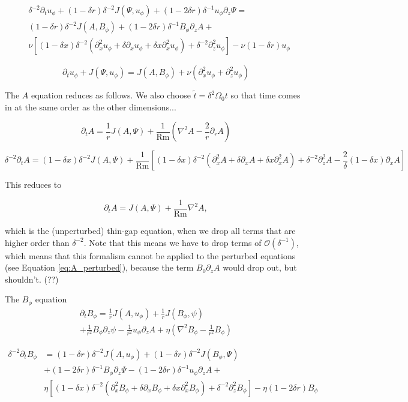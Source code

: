 \documentclass{paper}
\newcommand{\beq}{\begin{equation}}
\newcommand{\eeq}{\end{equation}}
\newcommand{\uphi}{\ensuremath{u_\phi}}
\newcommand\reym{\mathrm{Rm}}
\begin{document}
\beq
\begin{split}
& \delta^{-2} \partial_t u_\phi + (1 - \delta r)\delta^{-2} J(\Psi, u_\phi) + (1 - 2\delta r)\delta^{-1} u_\phi \partial_z \Psi  = \\
& (1 - \delta r)\delta^{-2} J(A, B_\phi) + (1 - 2\delta r)\delta^{-1} B_\phi \partial_z A + \\
& \nu \left[(1 - \delta x) \delta^{-2} \left(\partial_x^2 u_\phi + \delta \partial_x u_\phi + \delta x \partial_x^2 u_\phi \right) + \delta^{-2} \partial_z^2 u_\phi \right] - \nu(1 - \delta r) u_\phi
\end{split}
\eeq

\beq
\partial_t u_\phi + J(\Psi, u_\phi) = J(A, B_\phi) + \nu(\partial_x^2 u_\phi + \partial_z^2 u_\phi)
\eeq


The $A$ equation reduces as follows. We also choose $\widetilde{t} = \delta^2 \Omega_0 t$ so that time comes in at the same order as the other dimensions...

\beq
\partial_t A = \frac{1}{r} J (A, \Psi) + \frac{1}{\reym} \left(\nabla^2 A - \frac{2}{r}\partial_r A \right)
\eeq

\beq
\delta^{-2} \partial_t A = (1 - \delta x)\delta^{-2} J(A, \Psi) + \frac{1}{\reym} \left[(1 - \delta x) \delta^{-2} \left(\partial_x^2 A + \delta\partial_x A + \delta x \partial_x^2 A \right) + \delta^{-2} \partial_z^2 A - \frac{2}{\delta}(1 - \delta x) \partial_x A \right]
\eeq

This reduces to 

\beq
\partial_t A = J(A, \Psi) + \frac{1}{\reym} \nabla^2 A,
\eeq

which is the (unperturbed) thin-gap equation, when we drop all terms that are higher order than $\delta^{-2}$. Note that this means we have to drop terms of $\mathcal{O}(\delta^{-1})$, which means that this formalism cannot be applied to the perturbed equations (see Equation \ref{eq:A_perturbed}), because the term $B_0\partial_zA$ would drop out, but shouldn't. (??)

The $B_\phi$ equation
\begin{multline}
\partial_t B_\phi = \frac{1}{r} J(A, \uphi) + \frac{1}{r} J(B_\phi, \psi)\\
+ \frac{1}{r^2} B_\phi \partial_z \psi - \frac{1}{r^2} \uphi \partial_z A + \eta \left(\nabla^2 B_\phi - \frac{1}{r^2} B_\phi \right)
\end{multline}

\beq
\begin{split}
\delta^{-2} \partial_t B_\phi  & = (1 - \delta r) \delta^{-2} J(A, u_\phi) + (1 - \delta r) \delta^{-2} J(B_\phi, \Psi) \\
& + (1 - 2 \delta r) \delta^{-1} B_\phi \partial_z \Psi - (1 - 2 \delta r) \delta^{-1} u_\phi \partial_z A + \\
& \eta\left[(1 - \delta x) \delta^{-2} \left(\partial_x^2 B_\phi + \delta \partial_x B_\phi + \delta x \partial_x^2 B_\phi \right) + \delta^{-2} \partial_z^2 B_\phi\right] - \eta (1 - 2\delta r) B_\phi
\end{split}
\eeq
\end{document}
